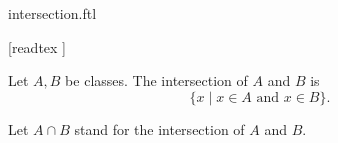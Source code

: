 \documentclass{stex}
\begin{document}
\begin{smodule}{intersection.ftl}

  \begin{forthel}

    [readtex ]
  \end{forthel}

  \begin{forthel}
    \begin{definition}
      Let $A, B$ be classes.
      The intersection of $A$ and $B$ is
      \[ \{ x \mid \text{$x \in A$ and $x \in B$} \}. \]
    \end{definition}

    Let $A \cap B$ stand for the intersection of $A$ and $B$.
  \end{forthel}
\end{smodule}
\end{document}
